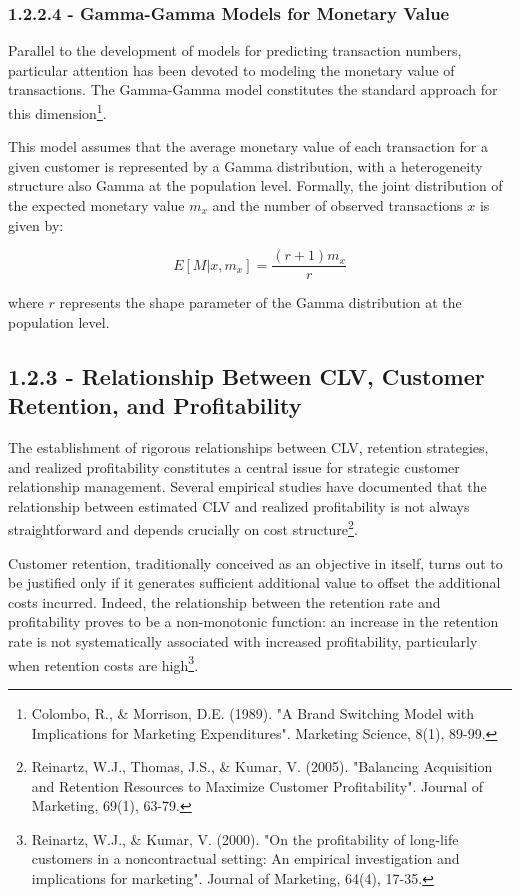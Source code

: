 \documentclass[12pt,a4paper,oneside]{report}
\begin{document}
\subsubsection{1.2.2.4 - Gamma-Gamma Models for Monetary Value}

Parallel to the development of models for predicting transaction numbers, particular attention has been devoted to modeling the monetary value of transactions. The Gamma-Gamma model constitutes the standard approach for this dimension\footnote{Colombo, R., \& Morrison, D.E. (1989). "A Brand Switching Model with Implications for Marketing Expenditures". Marketing Science, 8(1), 89-99.}.

This model assumes that the average monetary value of each transaction for a given customer is represented by a Gamma distribution, with a heterogeneity structure also Gamma at the population level. Formally, the joint distribution of the expected monetary value $m_x$ and the number of observed transactions $x$ is given by:

\begin{equation}
E[M|x, m_x] = \frac{(r+1)m_x}{r}
\label{eq:gamma_gamma}
\end{equation}

where $r$ represents the shape parameter of the Gamma distribution at the population level.

\subsection{1.2.3 - Relationship Between CLV, Customer Retention, and Profitability}

The establishment of rigorous relationships between CLV, retention strategies, and realized profitability constitutes a central issue for strategic customer relationship management. Several empirical studies have documented that the relationship between estimated CLV and realized profitability is not always straightforward and depends crucially on cost structure\footnote{Reinartz, W.J., Thomas, J.S., \& Kumar, V. (2005). "Balancing Acquisition and Retention Resources to Maximize Customer Profitability". Journal of Marketing, 69(1), 63-79.}.

Customer retention, traditionally conceived as an objective in itself, turns out to be justified only if it generates sufficient additional value to offset the additional costs incurred. Indeed, the relationship between the retention rate and profitability proves to be a non-monotonic function: an increase in the retention rate is not systematically associated with increased profitability, particularly when retention costs are high\footnote{Reinartz, W.J., \& Kumar, V. (2000). "On the profitability of long-life customers in a noncontractual setting: An empirical investigation and implications for marketing". Journal of Marketing, 64(4), 17-35.}.
\end{document}
